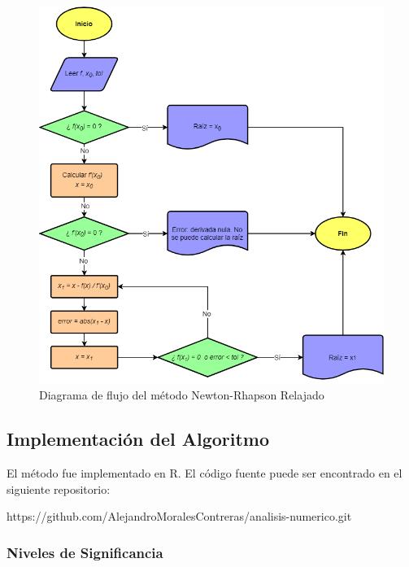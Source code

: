 \documentclass[a4paper,12pt]{article}
\begin{document}
\begin{figure}[h!]
\centering
\includegraphics[scale=0.8]{img/flujograma_nrr.png}
\vspace{-1em}
\caption{Diagrama de flujo del método Newton-Rhapson Relajado}
\label{fig:flujograma_nrr}
\end{figure}

\newpage

\subsection{Implementación del Algoritmo}

El método fue implementado en R. El código fuente puede ser encontrado en el siguiente repositorio: \par

\vspace{1em}
https://github.com/AlejandroMoralesContreras/analisis-numerico.git \par

\subsubsection{Niveles de Significancia}
\end{document}

